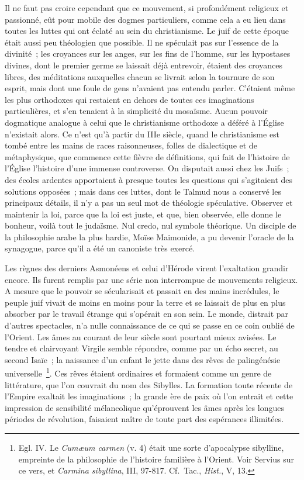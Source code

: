 \documentclass[french,twoside]{book} %
\begin{document}
Il ne faut pas croire cependant que ce mouvement, si profondément religieux et passionné, eût pour mobile des dogmes particuliers, comme cela a eu lieu dans toutes les luttes qui ont éclaté au sein du christianisme. Le juif de cette époque était aussi peu théologien que possible. Il ne spéculait pas sur l’essence de la divinité ; les croyances sur les anges, sur les fins de l’homme, sur les hypostases divines, dont le premier germe se laissait déjà entrevoir, étaient des croyances libres, des méditations auxquelles chacun se livrait selon la tournure de son esprit, mais dont une foule de gens n’avaient pas entendu parler. C’étaient même les plus orthodoxes qui restaient en dehors de toutes ces imaginations particulières, et s’en tenaient à la simplicité du mosaïsme. Aucun pouvoir dogmatique analogue à celui que le christianisme orthodoxe a déféré à l’Église n’existait alors. Ce n’est qu’à partir du IIIe siècle, quand le christianisme est tombé entre les mains de races raisonneuses, folles de dialectique et de métaphysique, que commence cette fièvre de définitions, qui fait de l’histoire de l’Église l’histoire d’une immense controverse. On disputait aussi chez les Juifs ; des écoles ardentes apportaient à presque toutes les questions qui s’agitaient des solutions opposées ; mais dans ces luttes, dont le Talmud nous a conservé les principaux détails, il n’y a pas un seul mot de théologie spéculative. Observer et maintenir la loi, parce que la loi est juste, et que, bien observée, elle donne le bonheur, voilà tout le judaïsme. Nul credo, nul symbole théorique. Un disciple de la philosophie arabe la plus hardie, Moïse Maimonide, a pu devenir l’oracle de la synagogue, parce qu’il a été un canoniste très exercé.\par
Les règnes des derniers Asmonéens et celui d’Hérode virent l’exaltation grandir encore. Ils furent remplis par une série non interrompue de mouvements religieux. A mesure que le pouvoir se sécularisait et passait en des mains incrédules, le peuple juif vivait de moins en moins pour la terre et se laissait de plus en plus absorber par le travail étrange qui s’opérait en son sein. Le monde, distrait par d’autres spectacles, n’a nulle connaissance de ce qui se passe en ce coin oublié de l’Orient. Les âmes au courant de leur siècle sont pourtant mieux avisées. Le tendre et clairvoyant Virgile semble répondre, comme par un écho secret, au second Isaïe ; la naissance d’un enfant le jette dans des rêves de palingénésie universelle \footnote{ Egl. IV. Le {\itshape Cumæum carmen} (v. 4) était une sorte d’apocalypse sibylline, empreinte de la philosophie de l’histoire familière à l’Orient. Voir Servius sur ce vers, et {\itshape Carmina sibyllina}, III, 97-817. Cf. Tac., {\itshape Hist.}, V, 13.}. Ces rêves étaient ordinaires et formaient comme un genre de littérature, que l’on couvrait du nom des Sibylles. La formation toute récente de l’Empire exaltait les imaginations ; la grande ère de paix où l’on entrait et cette impression de sensibilité mélancolique qu’éprouvent les âmes après les longues périodes de révolution, faisaient naître de toute part des espérances illimitées.\par
\end{document}
